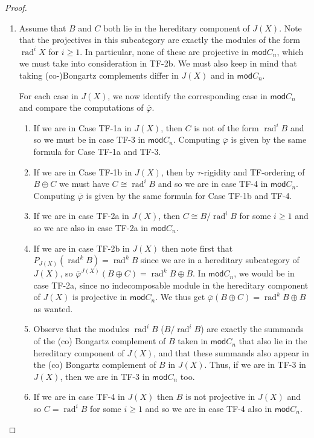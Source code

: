 \documentclass[11pt]{amsart}
\newcommand{\mods}{\mathsf{mod}}
\DeclareMathOperator{\rad}{\mathrm{rad}}
\theoremstyle{definition}
\begin{document}
\begin{proof}
\begin{enumerate}
        \item Assume that $B$ and $C$ both lie in the hereditary component of $J(X)$. Note that the projectives in this subcategory are exactly the modules of the form $\rad^i X$ for $i \geq 1$. In particular, none of these are projective in $\mods C_n$, which we must take into consideration in TF-2b. We must also keep in mind that taking (co-)Bongartz complements differ in $J(X)$ and in $\mods C_n$. 

        For each case in $J(X)$, we now identify the corresponding case in $\mods C_n$ and compare the computations of $\overline{\varphi}$.

        \begin{enumerate}
            \item[(TF-1a)]  If we are in Case TF-1a in $J(X)$, then $C$ is not of the form $\rad^i B$ and so we must be in case TF-3 in $\mods C_n$. Computing $\overline{\varphi}$ is given by the same formula for Case TF-1a and TF-3.

            \item[(TF-1b)]  If we are in Case TF-1b in $J(X)$, then by $\tau$-rigidity and TF-ordering of $B \oplus C$ we must have $C \cong \rad^i B$ and so we are in case TF-4 in $\mods C_n$. Computing $\overline{\varphi}$ is given by the same formula for Case TF-1b and TF-4.

            \item[(TF-2a)]  If we are in case TF-2a in $J(X)$, then $C \cong B/\rad^i B$ for some $i \geq 1$ and so we are also in case TF-2a in $\mods C_n$.

            \item[(TF-2b)] If we are in case TF-2b in $J(X)$ then note first that $P_{J(X)}(\rad^k B) = \rad^k B$ since we are in a hereditary subcategory of $J(X)$, so $\overline{\varphi}^{J(X)}(B \oplus C) = \rad^k B \oplus B$. In $\mods C_n$, we would be in case TF-2a, since no indecomposable module in the hereditary component of $J(X)$ is projective in $\mods C_n$. We thus get $\overline{\varphi}(B \oplus C) = \rad^k B \oplus B$ as wanted.

            \item[(TF-3)] Observe that the modules $\rad^i B$ ($B/\rad^i B$) are exactly the summands of the (co) Bongartz complement of $B$ taken in $\mods C_n$ that also lie in the hereditary component of $J(X)$, and that these summands also appear in the (co) Bongartz complement of $B$ in $J(X)$.  Thus, if we are in TF-3 in $J(X)$, then we are in TF-3 in $\mods C_n$ too.
            
            \item[(TF-4)] If we are in case TF-4 in $J(X)$ then $B$ is not projective in $J(X)$ and so $C = \rad^iB$ for some $i \geq 1$ and so we are in case TF-4 also in $\mods C_n$.
        \end{enumerate}

        
    \end{enumerate}
\end{proof}
\end{document}
